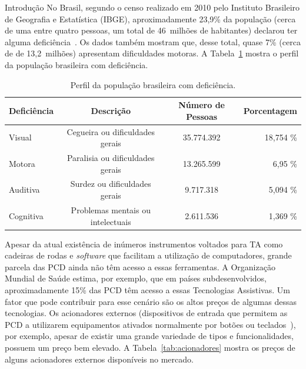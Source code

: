 \begin{chapter}{Introdução}
No Brasil, segundo o censo realizado em 2010 pelo Instituto Brasileiro de
Geografia e Estatística (IBGE), aproximadamente 23,9\% da população (cerca de
uma entre quatro pessoas, um total de 46~milhões de habitantes) declarou ter
alguma deficiência~\cite{tIBGE}. Os dados também mostram que, desse total, quase
7\% (cerca de de 13,2~milhões) apresentam dificuldades motoras. A
Tabela~\ref{tab:ibge} mostra o perfil da população brasileira com deficiência.

\begin{table}[!h]
\centering
\caption{Perfil da população brasileira com deficiência.}
\label{tab:ibge}
\def\arraystretch{1.25}
\begin{tabular}{lccr}
	\hline
	\hline
	\textbf{Deficiência} & \textbf{Descrição} & \textbf{Número de Pessoas} &
\textbf{Porcentagem} \\
	\hline
	Visual    & Cegueira ou dificuldades gerais   & 35.774.392  & 18,754 \%  \\
	Motora    & Paralisia ou dificuldades gerais  & 13.265.599  & 6,95 \% \\
	Auditiva  & Surdez ou dificuldades gerais     & 9.717.318   &  5,094 \%  \\
	Cognitiva & Problemas mentais ou intelectuais & 2.611.536   &  1,369 \%  \\ 
	\hline
	\hline
\end{tabular}
\end{table}

Apesar da atual existência de inúmeros instrumentos voltados para TA como
cadeiras de rodas e \textit{software} que facilitam a utilização de
computadores, grande parcela das PCD ainda não têm acesso a essas ferramentas. A
Organização Mundial de Saúde estima, por exemplo, que em países
subdesenvolvidos, aproximadamente 15\% das PCD têm acesso a essas Tecnologias
Assistivas\cite{WHO15}. Um fator que pode contribuir para esse cenário são os
altos preços de algumas dessas tecnologias. Os acionadores externos (dispositivos
de entrada que permitem as PCD a utilizarem equipamentos ativados normalmente por
botões ou teclados~\cite{tecla}), por exemplo, apesar de existir uma grande
variedade de tipos e funcionalidades, possuem um preço bem elevado. A
Tabela~\ref{tab:acionadores} mostra os preços de alguns acionadores externos
disponíveis no mercado. 
 

\end{chapter}

